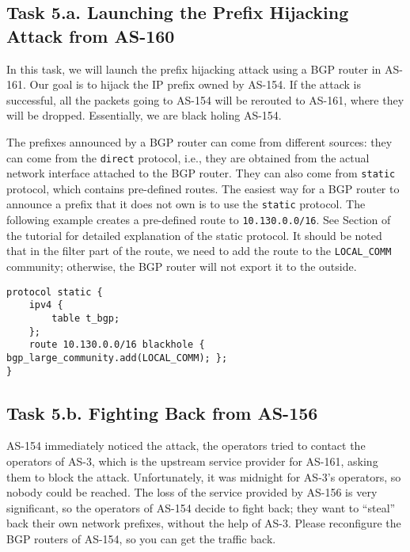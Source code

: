 \subsection{Task 5.a. Launching the Prefix Hijacking Attack from AS-160} 

In this task, we will launch the prefix hijacking attack
using a BGP router in AS-161. Our goal is to hijack
the IP prefix owned by AS-154. If the attack is successful,
all the packets going to AS-154 will be rerouted to AS-161, where
they will be dropped. Essentially, we are black holing AS-154.

The prefixes announced by a BGP router can come from different 
sources: they can come from the \texttt{direct} protocol, 
i.e., they are obtained from the actual network interface attached
to the BGP router. They can also come from \texttt{static} protocol,
which contains pre-defined routes. The easiest way for a BGP router to 
announce a prefix that it does not own is to use 
the \texttt{static} protocol. The following  
example creates a pre-defined route to \texttt{10.130.0.0/16}. 
See Section \bgpprotocol of the tutorial for detailed explanation of the static protocol.
It should be noted that in the filter part of the route,
we need to add the route to the \texttt{LOCAL\_COMM} community; 
otherwise, the BGP router will not export it to the outside.   

\begin{lstlisting}
protocol static {
    ipv4 {
        table t_bgp;
    };
    route 10.130.0.0/16 blackhole { bgp_large_community.add(LOCAL_COMM); };
}
\end{lstlisting}


\subsection{Task 5.b. Fighting Back from AS-156} 

AS-154 immediately noticed the attack, the operators tried to contact
the operators of AS-3, which is the upstream service provider for AS-161,
asking them to block the attack. Unfortunately, it was midnight for AS-3's
operators, so nobody could be reached. The loss of the service provided 
by AS-156 is very significant, so the operators of AS-154 decide to 
fight back; they want to ``steal'' back their own network prefixes, without the help
of AS-3. Please reconfigure the BGP routers of AS-154, so 
you can get the traffic back. 


